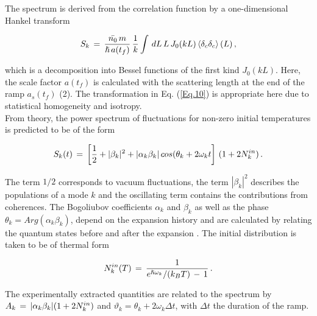\documentclass[11pt,twocolumn,letterpaper]{article}
\newcounter{ns}
\begin{document}
The spectrum is derived from the correlation function by a one-dimensional Hankel transform

\begin{equation}
    \label{Eq.10}
    S_{k} \thinspace = \thinspace \frac{\Bar{n_{0}} \thinspace m}{\hslash \thinspace a (t_{f})} \thinspace \frac{1}{k} \int \thinspace dL \thinspace L \thinspace J_{0} (kL) \thinspace \langle \delta_{c} \delta_{c} \rangle \thinspace (L) \thinspace , 
\end{equation}

which is a decomposition into Bessel functions of the first kind $J_{0} (kL)$. Here, the scale factor $a(t_{f})$ is calculated with the scattering length at the end of the ramp $a_{s} (t_{f})$ (2). The transformation in Eq. (\ref{Eq.10}) is appropriate here due to statistical homogeneity and isotropy.\\

From theory, the power spectrum of fluctuations for
non-zero initial temperatures is predicted to be of the form

\begin{equation}
    \label{Eq.11}
    S_{k} (t) \thinspace = \thinspace \left[ \frac{1}{2} + | \beta_{k} |^{2} + | \alpha_{k} \beta_{k} | \thinspace cos (\theta_{k} + 2 \omega_{k} t \right] \thinspace (1 + 2 N^{in}_{k}) \thinspace .
\end{equation}

The term $1/2$ corresponds to vacuum fluctuations, the term $| \beta_{k} |^{2}$ describes the populations of a mode $k$ and the oscillating term contains the contributions from coherences. The Bogoliubov coefficients $\alpha_{k}$ and $\beta_{k}$ as well as the phase $\theta_{k} = Arg(\alpha_{k} \beta_{k})$, depend on the expansion history and are calculated by relating the quantum states before and after the expansion \cite{Lb.48}. The initial distribution is taken to be of thermal form

\begin{equation}
    \label{Eq.12}
    N^{in}_{k} (T) \thinspace = \thinspace \frac{1}{e^{\hslash \omega_{k}}  /  (k_{B}T) \thinspace - \thinspace 1} \thinspace .
\end{equation}

The experimentally extracted quantities are related to the spectrum by $A_{k} \thinspace = \thinspace | \alpha_{k} \beta_{k} | (1 + 2N^{in}_{k}) $ and $\vartheta_{k} = \theta_{k} + 2 \omega_{k} \Delta t$, with $\Delta t$ the duration of the ramp.\\
\end{document}
